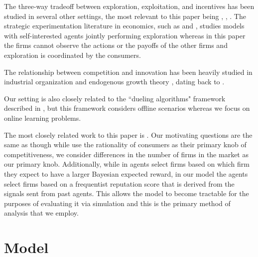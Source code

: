 \documentclass{article}
\theoremstyle{definition}
\begin{document}
The three-way tradeoff between exploration, exploitation, and incentives has been studied in several other settings, the most relevant to this paper being \citealt*{che2017recommender}, \citealt*{kremer2014implementing}, \citealt*{mansour2015bayesian}. The strategic experimentation literature in economics, such as \citealt*{bolton1999strategic} and \citealt*{keller2005strategic}, studies models with self-interested agents jointly performing exploration whereas in this paper the firms cannot observe the actions or the payoffs of the other firms and exploration is coordinated by the consumers.

The relationship between competition and innovation has been heavily studied in industrial organization \citep{tirole1988theory} and endogenous growth theory \citep{aghion2005competition, barro2004economic}, dating back to \citet{schumpeter2010capitalism}. 

Our setting is also closely related to the ``dueling algorithms" framework described in \cite{immorlica2011dueling}, but this framework considers offline scenarios whereas we focus on online learning problems.

The most closely related work to this paper is \citealt*{mansour2018competing}. Our motivating questions are the same as \citet{mansour2018competing} though while \citet{mansour2018competing} use the rationality of consumers as their primary knob of competitiveness, we consider differences in the number of firms in the market as our primary knob. Additionally, while in \citet{mansour2018competing} agents select firms based on which firm they expect to have a larger Bayesian expected reward, in our model the agents select firms based on a frequentist reputation score that is derived from the signals sent from past agents. This allows the model to become tractable for the purposes of evaluating it via simulation and this is the primary method of analysis that we employ.

\section{Model}\label{S:2}
\end{document}
